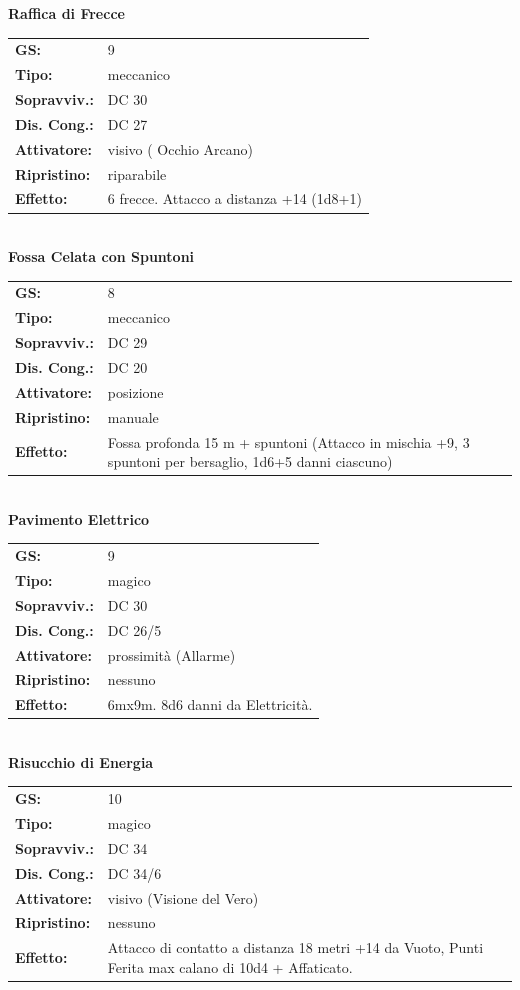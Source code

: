 \begin{multicols}{2}
\textbf{Raffica di Frecce}

\begin{tabularx}{0.48\textwidth}{lX}
	\textbf{GS:} & 9 \\
	\textbf{Tipo:} & meccanico \\
	\textbf{Sopravviv.:} & DC 30 \\
	\textbf{Dis. Cong.:} & DC 27 \\
	\textbf{Attivatore:} & visivo ( Occhio Arcano) \\
	\textbf{Ripristino:} & riparabile \\
	\textbf{Effetto:} & 6 frecce. Attacco a distanza +14 (1d8+1) 
\end{tabularx}\\

\textbf{Fossa Celata con Spuntoni}

\begin{tabularx}{0.48\textwidth}{lX}
	\textbf{GS:} & 8 \\
	\textbf{Tipo:} & meccanico \\
	\textbf{Sopravviv.:} & DC 29 \\
	\textbf{Dis. Cong.:} & DC 20 \\
	\textbf{Attivatore:} & posizione \\
	\textbf{Ripristino:} & manuale \\
	\textbf{Effetto:} & Fossa profonda 15 m + spuntoni (Attacco in mischia +9, 3 spuntoni per bersaglio, 1d6+5 danni ciascuno) 
\end{tabularx}\\

\textbf{Pavimento Elettrico}

\begin{tabularx}{0.48\textwidth}{lX}
	\textbf{GS:} & 9 \\
	\textbf{Tipo:} & magico \\
	\textbf{Sopravviv.:} & DC 30 \\
	\textbf{Dis. Cong.:} & DC 26/5 \\
	\textbf{Attivatore:} & prossimità (Allarme) \\
	\textbf{Ripristino:} & nessuno \\
	\textbf{Effetto:} & 6mx9m. 8d6 danni da Elettricità.
\end{tabularx}\\

\textbf{Risucchio di Energia}

\begin{tabularx}{0.48\textwidth}{lX}
	\textbf{GS:} & 10 \\
	\textbf{Tipo:} & magico \\
	\textbf{Sopravviv.:} & DC 34 \\
	\textbf{Dis. Cong.:} & DC 34/6 \\
	\textbf{Attivatore:} & visivo (Visione del Vero) \\
	\textbf{Ripristino:} & nessuno \\
	\textbf{Effetto:} & Attacco di contatto a distanza 18 metri +14 da Vuoto, Punti Ferita max calano di 10d4 + Affaticato.
\end{tabularx}\\


\end{multicols}
